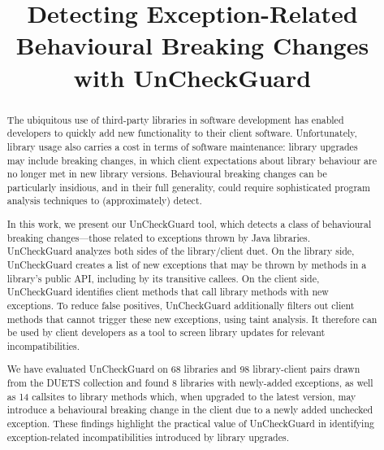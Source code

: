 \documentclass[conference]{IEEEtran}
\begin{document}
	\title {Detecting Exception-Related Behavioural Breaking Changes with UnCheckGuard}


    \maketitle
    \thispagestyle{plain}
    \pagestyle{plain}

    \begin{abstract}
      The ubiquitous use of third-party libraries in software development has enabled developers to quickly add
      new functionality to their client software. Unfortunately, library usage also carries a cost in
      terms of software maintenance: library upgrades may include breaking changes, in which client expectations
      about library behaviour are no longer met in new library versions. Behavioural breaking
      changes can be particularly insidious, and in their full generality, could require sophisticated program
      analysis techniques to (approximately) detect.

      In this work, we present our UnCheckGuard tool, which detects a class of behavioural breaking changes---those
      related to exceptions thrown by Java libraries. UnCheckGuard analyzes both sides of the library/client
      duet. On the library side, UnCheckGuard creates a list of new exceptions that may be thrown by methods
      in a library's public API, including by its transitive callees. On the client side, UnCheckGuard identifies
      client methods that call library methods with new exceptions. To reduce false positives, UnCheckGuard
      additionally filters out client methods that cannot trigger these new exceptions, using taint analysis. It therefore can be
      used by client developers as a tool to screen library updates for relevant incompatibilities.

      We have evaluated UnCheckGuard on 68 libraries and 98 library-client pairs drawn from the DUETS collection
      and found 8 libraries with newly-added exceptions, as well as 14 callsites to library methods which,
      when upgraded to the latest version, may introduce
      a behavioural breaking change in the client due to a newly added unchecked exception. These findings
      highlight the practical value of UnCheckGuard in identifying exception-related incompatibilities
      introduced by library upgrades.


    \end{abstract}
    
\end{document}
